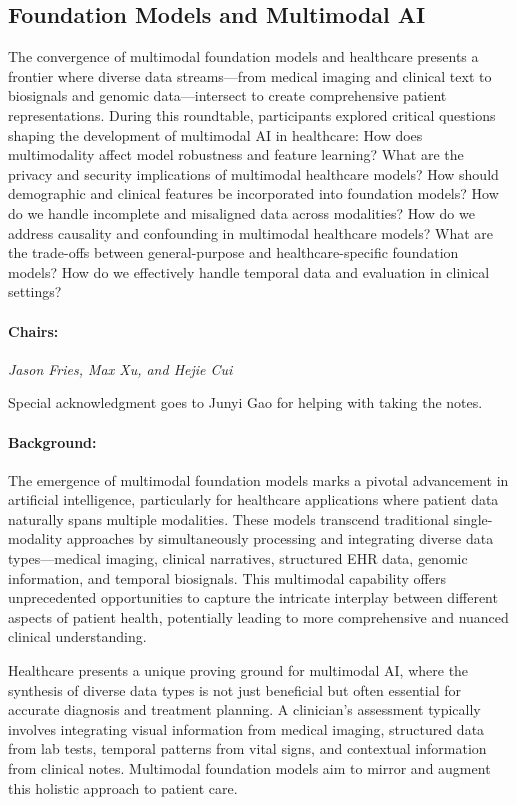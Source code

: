 \subsection{Foundation Models and Multimodal AI}
The convergence of multimodal foundation models and healthcare presents a frontier where diverse data streams—from medical imaging and clinical text to biosignals and genomic data—intersect to create comprehensive patient representations. During this roundtable, participants explored critical questions shaping the development of multimodal AI in healthcare:
How does multimodality affect model robustness and feature learning?
What are the privacy and security implications of multimodal healthcare models?
How should demographic and clinical features be incorporated into foundation models?
How do we handle incomplete and misaligned data across modalities?
How do we address causality and confounding in multimodal healthcare models?
What are the trade-offs between general-purpose and healthcare-specific foundation models?
How do we effectively handle temporal data and evaluation in clinical settings?

\paragraph{Chairs:}
\textit{Jason Fries, Max Xu, and Hejie Cui} 

\noindent Special acknowledgment goes to Junyi Gao for helping with taking the notes. 

\paragraph{Background:}
The emergence of multimodal foundation models marks a pivotal advancement in artificial intelligence, particularly for healthcare applications where patient data naturally spans multiple modalities. These models transcend traditional single-modality approaches by simultaneously processing and integrating diverse data types—medical imaging, clinical narratives, structured EHR data, genomic information, and temporal biosignals. This multimodal capability offers unprecedented opportunities to capture the intricate interplay between different aspects of patient health, potentially leading to more comprehensive and nuanced clinical understanding.

Healthcare presents a unique proving ground for multimodal AI, where the synthesis of diverse data types is not just beneficial but often essential for accurate diagnosis and treatment planning. A clinician's assessment typically involves integrating visual information from medical imaging, structured data from lab tests, temporal patterns from vital signs, and contextual information from clinical notes. Multimodal foundation models aim to mirror and augment this holistic approach to patient care.

